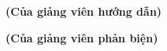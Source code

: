 \begin{center}\textbf{(Của giảng viên hướng dẫn)}\end{center}

\fillwithdottedlines

\begin{center}\textbf{(Của giảng viên phản biện)}\end{center}

\fillwithdottedlines